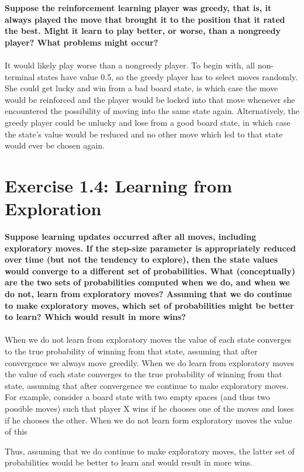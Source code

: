 \documentclass[a4paper,11pt]{article}
\numberwithin{equation}{section}
\theoremstyle{remark}
\begin{document}
\textbf{Suppose the reinforcement learning player was greedy, that is, it always played the move that brought it to the position that it rated the best. Might it learn to play better, or worse, than a nongreedy player? What problems might occur?}
\\ \\
It would likely play worse than a nongreedy player. To begin with, all non-terminal states have value 0.5, so the greedy player has to select moves randomly. She could get lucky and win from a bad board state, is which case the move would be reinforced and the player would be locked into that move whenever she encountered the possibility of moving into the same state again. Alternatively, the greedy player could be unlucky and lose from a good board state, in which case the state's value would be reduced and no other move which led to that state would ever be chosen again.


\section{Exercise 1.4: Learning from Exploration}

\textbf{Suppose learning updates occurred after all moves, including exploratory moves. If the step-size parameter is appropriately reduced over time (but not the tendency to explore), then the state values would converge to a different set of probabilities. What (conceptually) are the two sets of probabilities computed when we do, and when we do not, learn from exploratory moves? Assuming that we do continue to make exploratory moves, which set of probabilities might be better to learn? Which would result in more wins?}
\\ \\
When we do not learn from exploratory moves the value of each state converges to the true probability of winning from that state, assuming that after convergence we always move greedily. When we do learn from exploratory moves the value of each state converges to the true probability of winning from that state, assuming that after convergence we continue to make exploratory moves. For example, consider a board state with two empty spaces (and thus two possible moves) such that player X wins if he chooses one of the moves and loses if he chooses the other. When we do not learn form exploratory moves the value of this 


Thus, assuming that we do continue to make exploratory moves, the latter set of probabilities would be better to learn and would result in more wins.
\end{document}
